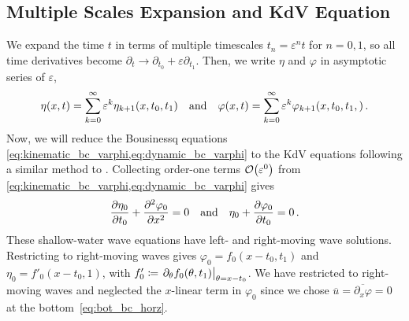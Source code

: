 \documentclass{jfm}
\renewcommand*{\epsilon}{\varepsilon}
\begin{document}
\subsection{\label{sec:shallow_water} Multiple Scales Expansion and KdV
Equation}
We expand the time $t$ in terms of multiple timescales $t_n =
\epsilon^n t$ for $n= 0,1$, so all time derivatives become $\partial_t \to
\partial_{t_0} + \epsilon \partial_{t_1}$.
Then, we write $\eta$ and $\varphi$ in asymptotic series of $\epsilon$,
\begin{equation}
  \eta(x,t) = \sum_{k=0}^{\infty} \epsilon^k
    \eta_{k+1}(x,t_0,t_1) \qq{and}
  \varphi(x,t) = \sum_{k=0}^{\infty} \epsilon^k
    \varphi_{k+1}(x,t_0,t_1,) \,.
\end{equation}
Now, we will reduce the Bousinessq equations
\cref{eq:kinematic_bc_varphi,eq:dynamic_bc_varphi} to the KdV equations
following a similar method to \citet{mei2005nonlinear}.
Collecting order-one terms $\order{\epsilon^0}$ from
\cref{eq:kinematic_bc_varphi,eq:dynamic_bc_varphi} gives
\begin{equation}
  \pdv{\eta_0}{t_0} + \pdv[2]{\varphi_0}{x} = 0 \qq{and}
  \eta_0 + \pdv{\varphi_0}{t_0} = 0 \,.
\end{equation}
These shallow-water wave equations have left- and right-moving wave
solutions.
Restricting to right-moving waves gives $\varphi_0 = f_0(x-t_0,t_1)$ and
$\eta_0 = f'_0(x-t_0,1)$, with $f_0' \coloneqq \eval{\partial_{\theta}
f_0(\theta,t_1)}_{\theta = x-t_0}$.
We have restricted to right-moving waves and neglected the $x$-linear
term in $\varphi_0$ since we chose $\overline{u} = \overline{\partial_x
\varphi} = 0$ at the bottom~\cref{eq:bot_bc_horz}.
\end{document}

